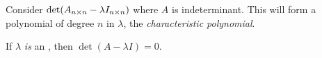 \begin{definition}\label{def:Characteristic_Polynomial}
  Consider $\det(A_{n \times n}-\lambda I_{n \times n})$ where $A$ is indeterminant.
  This will form a polynomial of degree $n$ in $\lambda$, the \emph{characteristic polynomial}.

  If $\lambda$ \emph{is} an , then $\det(A-\lambda I) = 0$.
\end{definition}



